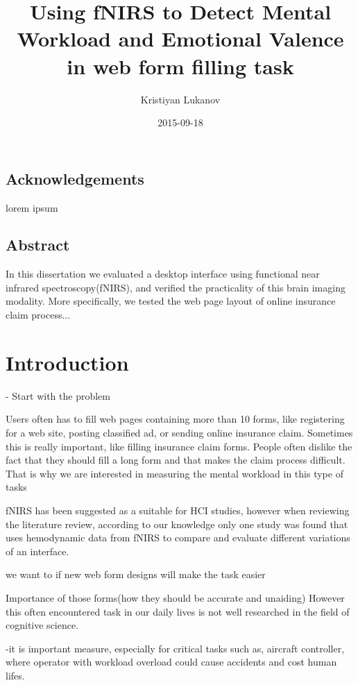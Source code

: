 \documentclass[a4paper]{report}
\title{Using fNIRS to Detect Mental Workload and Emotional Valence in web form filling task}%
\date{2015-09-18}
\author{Kristiyan Lukanov}
\begin{document}
	\maketitle
	\newpage
	
	\section*{Acknowledgements}
	lorem ipsum 
	\newpage
	
	\section*{Abstract}
	In this dissertation we evaluated a desktop interface using functional near infrared spectroscopy(fNIRS), and verified the practicality of this brain imaging modality. More specifically, we tested the web page layout of online insurance claim process...
	\newpage
	\tableofcontents
	\newpage
	
	\chapter{Introduction}
	- Start with the problem
	
	Users often has to fill web pages containing more than 10 forms, like registering for a web site, posting classified ad, or sending online insurance claim. Sometimes this is really important, like filling insurance claim forms. People often dislike the fact that they should fill a long form and that makes the claim process difficult. That is why we are interested in measuring the mental workload in this type of tasks
	
	fNIRS has been suggested as a suitable for HCI studies, however when reviewing the literature review, according to our knowledge only one study was found\cite{peck2013using} that uses hemodynamic data from fNIRS to compare and evaluate different variations of an interface.
	
	we want to if new web form designs will make the task easier
	
	Importance of those forms(how they should be accurate and unaiding)
	 However this often encountered task in our daily lives is not well researched in the field of cognitive science.	
	
	 -it is important measure, especially for critical tasks such as, aircraft controller, where operator with workload overload could cause accidents and cost human lifes.
	
\end{document}
